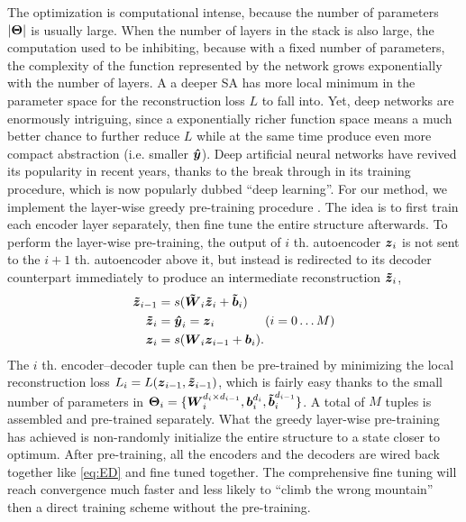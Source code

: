 The optimization is computational intense, because the number of parameters $|\boldsymbol{\Theta}|$ is usually large. When the number of layers in the stack is also large, the computation used to be inhibiting, because with a fixed number of parameters, the complexity of the function represented by the network grows exponentially with the number of layers. A a deeper SA has more local minimum in the parameter space for the reconstruction loss $L$ to fall into. Yet, deep networks are enormously intriguing, since a exponentially richer function space means a much better chance to further reduce $L$ while at the same time produce even more compact abstraction (i.e. smaller $\boldsymbol{\hat{y}}$). Deep artificial neural networks have revived its popularity in recent years, thanks to the break through in its training procedure, which is now popularly dubbed ``deep learning''. For our method, we implement the layer-wise greedy pre-training procedure \cite{DL:DBN1, DL:SDA1}. The idea is to first train each encoder layer separately, then fine tune the entire structure afterwards. To perform the layer-wise pre-training, the output of $i$ th. autoencoder $\boldsymbol{z}_i$ is not sent to the $i+1$ th. autoencoder above it, but instead is redirected to its decoder counterpart immediately to produce an intermediate reconstruction $\boldsymbol{\tilde{z}}_i$, 
\begin{equation*}
  \begin{split}
    \boldsymbol{\tilde{z}}_{i-1} &= s(\boldsymbol{\tilde{W}}_i \boldsymbol{\tilde{z}}_i + \boldsymbol{\tilde{b}}_i) \\
    \boldsymbol{\tilde{z}}_{i  } &= \boldsymbol{\hat{y}}_i = \boldsymbol{z}_i \quad \quad \quad \quad (i = 0 \dots M) \\
    \boldsymbol{z}_{i  } &= s(\boldsymbol{W}_i\boldsymbol{z}_{i-1} + \boldsymbol{b}_i). \\
  \end{split}
\end{equation*}
The $i$ th. encoder--decoder tuple can then be pre-trained by minimizing the local reconstruction loss $L_i=L(\boldsymbol{z}_{i-1}, \boldsymbol{\tilde{z}}_{i-1})$, which is fairly easy thanks to the small number of parameters in $\boldsymbol{\Theta}_i=\{\boldsymbol{W}_{i}^{d_{i} \times d_{i-1}}, \boldsymbol{b}_{i}^{d_{i}}, \boldsymbol{\tilde{b}}_{i}^{d_{i-1}}\}$. A total of $M$ tuples is assembled and pre-trained separately. What the greedy layer-wise pre-training has achieved is non-randomly initialize the entire structure to a state closer to optimum. After pre-training, all the encoders and the decoders are wired back together like \ref{eq:ED} and fine tuned together. The comprehensive fine tuning will reach convergence much faster and less likely to ``climb the wrong mountain'' then a direct training scheme without the pre-training.

